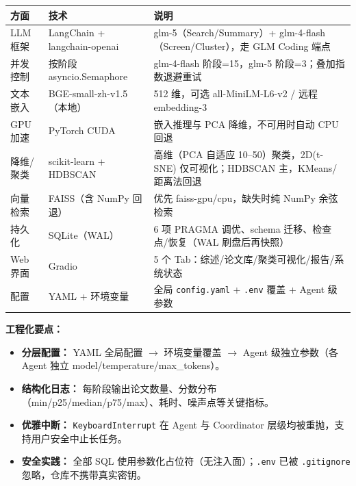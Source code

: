 \documentclass[10pt,a4paper]{article}
\begin{document}
\begin{center}\small
\begin{tabularx}{\linewidth}{lYY}
\toprule
\textbf{方面} & \textbf{技术} & \textbf{说明} \\
\midrule
LLM 框架   & LangChain + langchain-openai & glm-5（Search/Summary）+ glm-4-flash（Screen/Cluster），走 GLM Coding 端点 \\
并发控制   & 按阶段 asyncio.Semaphore      & glm-4-flash 阶段=15，glm-5 阶段=3；叠加指数退避重试 \\
文本嵌入   & BGE-small-zh-v1.5（本地）     & 512 维，可选 all-MiniLM-L6-v2 / 远程 embedding-3 \\
GPU 加速   & PyTorch CUDA                  & 嵌入推理与 PCA 降维，不可用时自动 CPU 回退 \\
降维/聚类  & scikit-learn + HDBSCAN        & 高维（PCA 自适应 10–50）聚类，2D(t-SNE) 仅可视化；HDBSCAN 主，KMeans/距离法回退 \\
向量检索   & FAISS（含 NumPy 回退）        & 优先 faiss-gpu/cpu，缺失时纯 NumPy 余弦检索 \\
持久化     & SQLite（WAL）                 & 6 项 PRAGMA 调优、schema 迁移、检查点/恢复（WAL 刷盘后再快照） \\
Web 界面   & Gradio                        & 5 个 Tab：综述/论文库/聚类可视化/报告/系统状态 \\
配置       & YAML + 环境变量               & 全局 \texttt{config.yaml} + \texttt{.env} 覆盖 + Agent 级参数 \\
\bottomrule
\end{tabularx}
\end{center}

\textbf{工程化要点：}
\begin{itemize}[leftmargin=2.2em,itemsep=0.05em]
  \item \textbf{分层配置：} YAML 全局配置 $\rightarrow$ 环境变量覆盖 $\rightarrow$ Agent 级独立参数（各 Agent 独立 model/temperature/max\_tokens）。
  \item \textbf{结构化日志：} 每阶段输出论文数量、分数分布（min/p25/median/p75/max）、耗时、噪声点等关键指标。
  \item \textbf{优雅中断：} \texttt{KeyboardInterrupt} 在 Agent 与 Coordinator 层级均被重抛，支持用户安全中止长任务。
  \item \textbf{安全实践：} 全部 SQL 使用参数化占位符（无注入面）；\texttt{.env} 已被 \texttt{.gitignore} 忽略，仓库不携带真实密钥。
\end{itemize}

\end{document}
